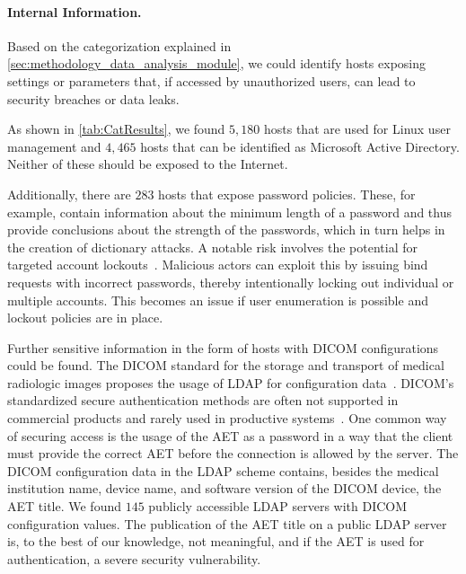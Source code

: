 


\paragraph{Internal Information.}
Based on the categorization explained in \cref{sec:methodology_data_analysis_module}, we could identify hosts exposing settings or parameters that, if accessed by unauthorized users, can lead to security breaches or data leaks.

As shown in \cref{tab:CatResults}, we found $5,180$ hosts that are used for Linux user management and $4,465$ hosts that can be identified as Microsoft Active Directory. Neither of these should be exposed to the Internet.

Additionally, there are $283$ hosts that expose password policies. These, for example, contain information about the minimum length of a password and thus provide conclusions about the strength of the passwords, which in turn helps in the creation of dictionary attacks.
A notable risk involves the potential for targeted account lockouts~\cite{sermersheimPasswordPolicyLDAP2022a}. Malicious actors can exploit this by issuing bind requests with incorrect passwords, thereby intentionally locking out individual or multiple accounts. This becomes an issue if user enumeration is possible and lockout policies are in place.

Further sensitive information in the form of hosts with \gls{DICOM} configurations could be found. The \gls{DICOM} standard for the storage and transport of medical radiologic images proposes the usage of LDAP for configuration data~\cite[Part~15,~H.1]{dicom}. DICOM's standardized secure authentication methods are often not supported in commercial products and rarely used in productive systems~\cite{ChallengesPacs}. One common way of securing access is the usage of the \gls{AET} as a password in a way that the client must provide the correct \gls{AET} before the connection is allowed by the server.
The DICOM configuration data in the LDAP scheme contains, besides the medical institution name, device name, and software version of the \gls{DICOM} device, the \gls{AET} title. 
We found $145$ publicly accessible LDAP servers with \gls{DICOM} configuration values. The publication of the \gls{AET} title on a public LDAP server is, to the best of our knowledge, not meaningful, and if the \gls{AET} is used for authentication, a severe security vulnerability.

